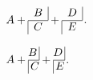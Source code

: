 \documentclass{article}
\makeatletter
\def\cFrac#1#2{%
\begin{array}{@{}c@{}}\multicolumn{1}{c|}{#1}\\%
\hline\multicolumn{1}{|c}{#2}\end{array}}
\def\cFracB#1#2{%
\vcenter{\hbox{\strut$#1$\,\vrule}\hrule\hbox{\strut\vrule\,$#2$}}}
\makeatother
\begin{document}
$ A + \cFrac{B}{C} + \cFrac{D}{E}$.

$ A + \cFracB{B}{C} + \cFracB{D}{E}$.
\end{document}
